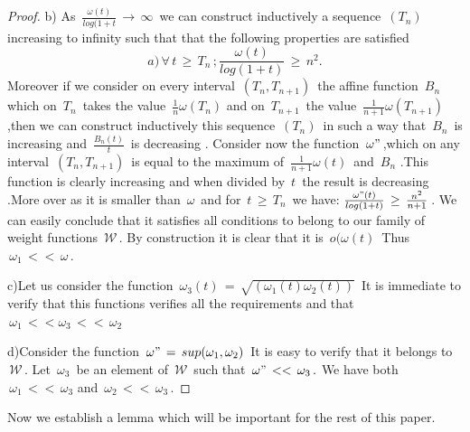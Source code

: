 \documentclass[12pt,a4paper]{amsart}
\begin{document}
\begin{proof}
b) As $\,\frac{\omega(t)}{log(1+t}\,\rightarrow\,\infty\,$
 we can construct inductively a sequence $\,(T_n)\,$ increasing to infinity
 such that that the following properties are satisfied
 $$a)\,\forall\,t\,\geq\,T_n\,
 ;\frac{\omega(t)}{log(1+t)}\,\geq\,n^2. $$
Moreover if we consider on every interval
 $\,(T_n,T_{n+1})\,$ the affine function $\,B_n\,$ which on 
 $\,T_n\,$ takes the value $\,\frac{1}{n}\omega(T_{n})$  
and on $\,T_{n+1}\,$ the value
 $\,\frac{1}{n+1}\omega(T_{n+1})$,then we can construct inductively this sequence $\,(T_n)\,$ in such a way that   $\,B_n\,$ is increasing and $\,\frac{B_n(t)}{t}\,$ is decreasing .
 Consider now the function $\,\omega"\,$,which on any interval $\,(T_n,T_{n+1})\,$ is equal to the maximum of
 $\,\frac{1}{n+1}\omega(t)\, $ and $\,B_n$ .This function is clearly increasing and when divided by $\,t\,$ the result is decreasing .More over as it is smaller than $\,\omega\,$ and for
  $\,t\,\geq\,T_n\,$ we have: 
  $\frac{\omega"(t)}{log(1+t)} \,\geq\,\frac{n^2}{n+1}\,$. We can easily conclude that it satisfies all conditions to belong  to our family of weight functions $\,\mathcal{W}\,.$
  By construction it is clear that it is $\,o(\omega(t)\,$
 Thus $\,\omega_1\,<<\,\omega\,.$
 
 c)Let us consider the function
  $\,\omega_3(t)\,= \,\sqrt{(\omega_1(t)\omega_2(t))}\,$
  It is immediate to verify that this functions verifies all the requirements and that 
  $\,\omega_1\,<<\omega_3\,<<\,\omega_2\,$
 
d)Consider the function
 $\,\omega"\,=\,sup(\omega_1,\omega_2)\,$ It is easy to verify that 
  it belongs to $\,\mathcal{W} \,$.
  Let $\,\omega_3\,$ be an element of $\,\mathcal{W}\,$
  such that $\,\omega"\,<<\,\omega_3\,.$
  We have both $\,\omega_1\,<<\,\omega_3$
  and $\,\omega_2\,<<\,\omega_3\,.$

\end{proof}




Now we establish a lemma which will be important for the rest of this paper. 
\end{document}
